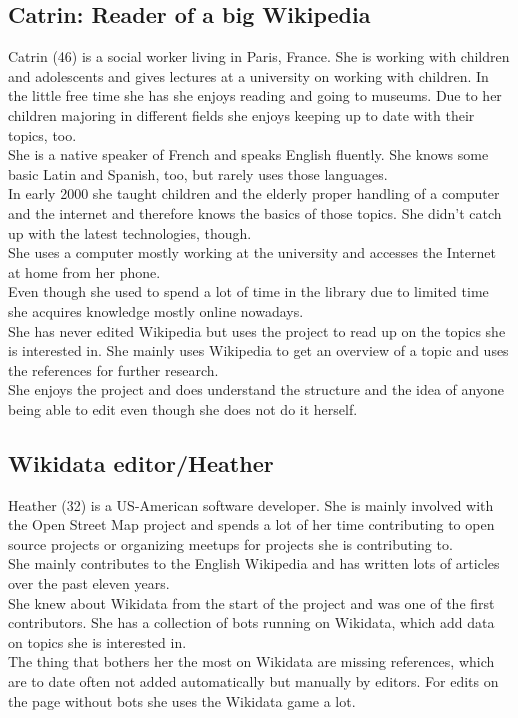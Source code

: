 \subsection{Catrin: Reader of a big Wikipedia}
Catrin (46) is a social worker living in Paris, France. She is working with children and adolescents and gives lectures at a university on working with children. In the little free time she has she enjoys reading and going to museums. Due to her children majoring in different fields she enjoys keeping up to date with their topics, too. \\
She is a native speaker of French and speaks English fluently. She knows some basic Latin and Spanish, too, but rarely uses those languages. \\
In early 2000 she taught children and the elderly proper handling of a computer and the internet and therefore knows the basics of those topics. She didn't catch up with the latest technologies, though. \\
She uses a computer mostly working at the university and accesses the Internet at home from her phone. \\
Even though she used to spend a lot of time in the library due to limited time she acquires knowledge mostly online nowadays. \\
She has never edited Wikipedia but uses the project to read up on the topics she is interested in. She mainly uses Wikipedia to get an overview of a topic and uses the references for further research. \\
She enjoys the project and does understand the structure and the idea of anyone being able to edit even though she does not do it herself. \\


\subsection{Wikidata editor/Heather}
Heather (32) is a US-American software developer. She is mainly involved with the Open Street Map project and spends a lot of her time contributing to open source projects or organizing meetups for projects she is contributing to. \\
She mainly contributes to the English Wikipedia and has written lots of articles over the past eleven years. \\
She knew about Wikidata from the start of the project and was one of the first contributors. She has a collection of bots running on Wikidata, which add data on topics she is interested in. \\
The thing that bothers her the most on Wikidata are missing references, which are to date often not added automatically but manually by editors. For edits on the page without bots she uses the Wikidata game a lot. 
